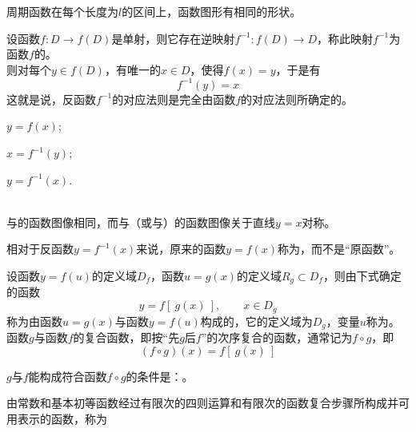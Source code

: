 \begin{note}
	周期函数在每个长度为\( l \)的区间上，函数图形有相同的形状。
\end{note}

\begin{definition}[反函数]
	设函数\( f : D \rightarrow f(D) \)是单射，则它存在逆映射\( f^{-1}:f(D) \rightarrow D \)，称此映射\( f ^{-1} \)为函数\( f \)的。\\
	则对每个\( y \in f(D) \)，有唯一的\( x \in D \)，使得\( f(x) = y \)，于是有
	\[ f^{-1}(y) = x \]
	这就是说，反函数\( f^{-1} \)的对应法则是完全由函数\( f \)的对应法则所确定的。
\end{definition}

\begin{note}
	\begin{enumerate*}[label=\Circled{\arabic*}]
		\item \( y = f(x) \);\quad
		\item \( x = f^{-1}(y) \);\quad
		\item \( y = f^{-1}(x) \).
	\end{enumerate*}\\
	与的函数图像相同，而与（或与）的函数图像关于直线\( y = x \)对称。
\end{note}
\begin{remark}
	相对于反函数\( y=f^{-1}(x) \)来说，原来的函数\( y = f(x) \)称为，而不是``原函数''。
\end{remark}

\begin{definition}[复合函数]
	设函数\( y=f(u) \)的定义域\( D_{f} \)，函数\( u=g(x) \)的定义域\( R_{g} \subset D_{f} \)，则由下式确定的函数
	\[ y = f[\ g(x)\ ],\qquad x \in D_{g} \]
	称为由函数\( u = g(x) \)与函数\( y = f(u) \)构成的，它的定义域为\( D_{g} \)，变量\( u \)称为。
	函数\( g \)与函数\( f \)的复合函数，即按``先\( g \)后\( f \)''的次序复合的函数，通常记为\( f \circ g \)，即
	\[ (f \circ g)(x) = f[\ g(x)\ ] \]
\end{definition}

\begin{note}
	\( g \)与\( f \)能构成符合函数\( f \circ g \)的条件是：。
\end{note}

\begin{definition}[初等函数]
	由常数和基本初等函数经过有限次的四则运算和有限次的函数复合步骤所构成并可用表示的函数，称为
\end{definition}

